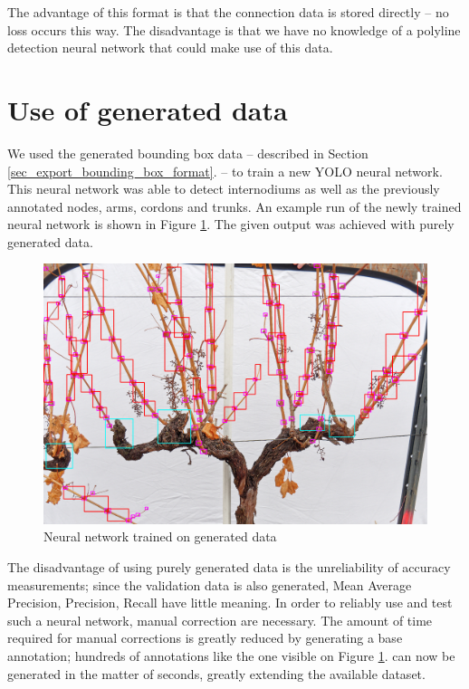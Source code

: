 \documentclass{PSAIE}%
\begin{document}
The advantage of this format is that the connection data is stored directly -- no loss occurs this way.
The disadvantage is that we have no knowledge of a polyline detection neural network that could make use of
this data.

\section{Use of generated data} \label{sec_use_of_generated_data}
We used the generated bounding box data -- described in Section \ref{sec_export_bounding_box_format}. --
to train a new YOLO neural network. This neural network was able to detect internodiums as well as the
previously annotated nodes, arms, cordons and trunks. An example run of the newly trained neural network
is shown in Figure \ref{fig_generated_data_train}. The given output was achieved with purely generated
data.

\begin{figure}[h]
      \centering
      \includegraphics[scale=0.23]{images/generated_train_data.png}
      \caption{Neural network trained on generated data}
      \label{fig_generated_data_train}
\end{figure}

The disadvantage of using purely generated data is the unreliability of accuracy measurements; since the
validation data is also generated, Mean Average Precision, Precision, Recall have little meaning. In order
to reliably use and test such a neural network, manual correction are necessary. The amount of time
required for manual corrections is greatly reduced by generating a base annotation; hundreds of annotations
like the one visible on Figure \ref{fig_generated_data_train}. can now be generated in the matter of seconds,
greatly extending the available dataset.
\end{document}
